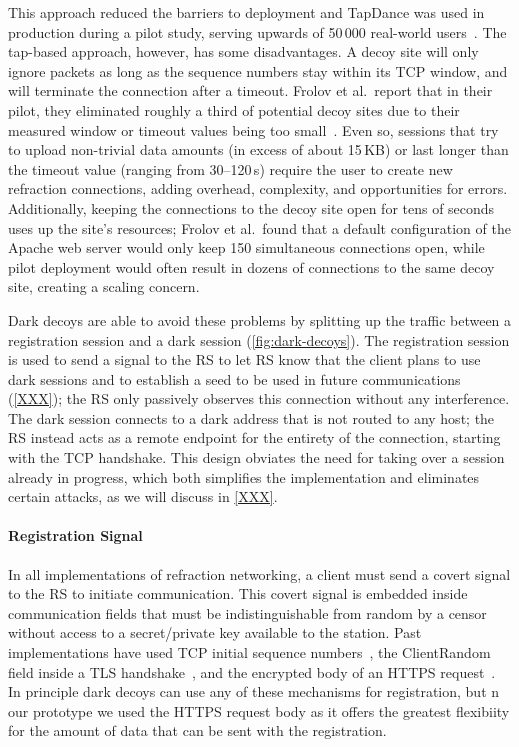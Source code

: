 This approach reduced the barriers to deployment and TapDance was used in production during a pilot study, serving upwards of 50\,000 real-world users~\cite{tapdance-foci17}.  The tap-based approach, however, has some disadvantages. A decoy site will only ignore packets as long as the sequence numbers stay within its TCP window, and will terminate the connection after a timeout. Frolov et al.\ report that in their pilot, they eliminated roughly a third of potential decoy sites due to their measured window or timeout values being too small~\cite{tapdance-foci17}. Even so, sessions that try to upload non-trivial data amounts (in excess of about 15\,KB) or last longer than the timeout value (ranging from 30--120\,s) require the user to create new refraction connections, adding overhead, complexity, and opportunities for errors. Additionally, keeping the connections to the decoy site open for tens of seconds uses up the site's resources; Frolov et al.\ found that a default configuration of the Apache web server would only keep 150 simultaneous connections open, while pilot deployment would often result in dozens of connections to the same decoy site, creating a scaling concern.

Dark decoys are able to avoid these problems by splitting up the traffic between a registration session and a dark session  (\cref{fig:dark-decoys}). The registration session is used to send a signal to the RS to let RS know that the client plans to use dark sessions and to establish a seed to be used in future communications (\cref{XXX}); the RS only passively observes this connection without any interference. The dark session connects to a dark address that is not routed to any host; the RS instead acts as a remote endpoint for the entirety of the connection, starting with the TCP handshake. This design obviates the need for taking over a session already in progress, which both simplifies the implementation and eliminates certain attacks, as we will discuss in \cref{XXX}.

\paragraph{Registration Signal} In all implementations of refraction networking, a client must send a covert signal to the RS to initiate communication. This covert signal is  embedded inside communication fields that must be indistinguishable from random by a censor without access to a secret/private key available to the station. Past implementations have used TCP initial sequence numbers~\cite{cirripede}, the ClientRandom field inside a TLS handshake~\cite{decoy-routing,telex}, and the encrypted body of an HTTPS request~\cite{tapdance}. In principle dark decoys can use any of these mechanisms for registration, but n our prototype we used the HTTPS request body as it offers the greatest flexibiity for the amount of data that can be sent with the registration.
